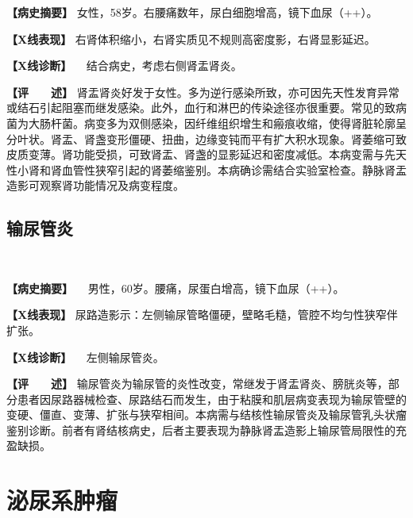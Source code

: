 \textbf{【病史摘要】}
女性，58岁。右腰痛数年，尿白细胞增高，镜下血尿（++）。

\textbf{【X线表现】}
右肾体积缩小，右肾实质见不规则高密度影，右肾显影延迟。

\textbf{【X线诊断】} 　结合病史，考虑右侧肾盂肾炎。

\textbf{【评　　述】}
肾盂肾炎好发于女性。多为逆行感染所致，亦可因先天性发育异常或结石引起阻塞而继发感染。此外，血行和淋巴的传染途径亦很重要。常见的致病菌为大肠杆菌。病变多为双侧感染，因纤维组织增生和瘢痕收缩，使得肾脏轮廓呈分叶状。肾盂、肾盏变形僵硬、扭曲，边缘变钝而平有扩大积水现象。肾萎缩可致皮质变薄。肾功能受损，可致肾盂、肾盏的显影延迟和密度减低。本病变需与先天性小肾和肾血管性狭窄引起的肾萎缩鉴别。本病确诊需结合实验室检查。静脉肾盂造影可观察肾功能情况及病变程度。

\subsection{输尿管炎}

\begin{figure}
    \centering
    \\
    \caption{}
    \label{fig6-4-7}
\end{figure}

\textbf{【病史摘要】} 　男性，60岁。腰痛，尿蛋白增高，镜下血尿（++）。

\textbf{【X线表现】}
尿路造影示：左侧输尿管略僵硬，壁略毛糙，管腔不均匀性狭窄伴扩张。

\textbf{【X线诊断】} 　左侧输尿管炎。

\textbf{【评　　述】}
输尿管炎为输尿管的炎性改变，常继发于肾盂肾炎、膀胱炎等，部分患者因尿路器械检查、尿路结石而发生，由于粘膜和肌层病变表现为输尿管壁的变硬、僵直、变薄、扩张与狭窄相间。本病需与结核性输尿管炎及输尿管乳头状瘤鉴别诊断。前者有肾结核病史，后者主要表现为静脉肾盂造影上输尿管局限性的充盈缺损。

\section{泌尿系肿瘤}


